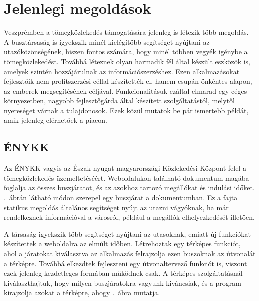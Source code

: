 \section{Jelenlegi megoldások}
\label{megoldasok}

Veszprémben a tömegközlekedés támogatására jelenleg is létezik több megoldás. 
A busztársaság is igyekszik minél kielégítőbb segítséget nyújtani az utazóközönségének, hiszen fontos számára, hogy minél többen vegyék igénybe a tömegközlekedést. 
Továbbá léteznek olyan harmadik fél által készült eszközök is, amelyek szintén hozzájárulnak az információszerzéshez. 
Ezen alkalmazásokat fejlesztőik nem profitszerzési céllal készítették el, hanem csupán önkéntes alapon, az emberek megsegítésének céljával.
Funkcionalitásuk ezáltal elmarad egy céges környezetben, nagyobb fejlesztőgárda által készített szolgáltatástól, melytől nyereséget várnak a tulajdonosok. 
Ezek közül mutatok be pár ismertebb példát, amik jelenleg elérhetőek a piacon. 



\subsection{ÉNYKK}
\label{enykk}

Az ÉNYKK\cite{enykk} vagyis az Észak-nyugat-magyarországi Közlekedési Központ felel a tömegközlekedés üzemeltetéséért. 
Weboldalukon található dokumentum magába foglalja az összes buszjáratot, és az azokhoz tartozó megállókat és indulási időket. 
.\ ábrán látható módon szerepel egy buszjárat a dokumentumban. 
Ez a fajta statikus megoldás általános segítséget nyújt az utazni vágyóknak, ha már rendelkeznek információval a városról, például a megállók elhelyezkedését illetően. 


A társaság igyekszik több segítséget nyújtani az utasoknak, emiatt új funkciókat készítettek a weboldalra az elmúlt időben. 
Létrehoztak egy térképes funkciót, ahol a járatokat kiválasztva az alkalmazás felrajzolja ezen buszoknak az útvonalát a térképre. 
Továbbá elkezdtek fejleszteni egy útvonaltervező funkciót is, viszont ezek jelenleg kezdetleges formában működnek csak. 
A térképes szolgáltatásnál kiválaszthajtuk, hogy milyen buszjáratokra vagyunk kiváncsiak, és a program kirajzolja azokat a térképre, ahogy .\ ábra mutatja. 


